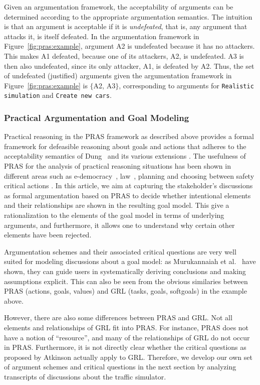 Given an argumentation framework, the acceptability of arguments can be determined according to the appropriate argumentation semantics. The intuition is that an argument is acceptable if it is \emph{undefeated}, that is, any argument that attacks it, is itself defeated. In the argumentation framework in Figure~\ref{fig:pras:example}, argument A2 is undefeated because it has no attackers. This makes A1 defeated, because one of its attackers, A2, is undefeated. A3 is then also undefeated, since its only attacker, A1, is defeated by A2. Thus, the set of undefeated (justified) arguments given the argumentation framework in Figure~\ref{fig:pras:example} is $\{$A2, A3$\}$, corresponding to arguments for \texttt{Realistic simulation} and \texttt{Create new cars}.

\subsubsection*{Practical Argumentation and Goal Modeling}
\label{sect:background:pras:motivation}

Practical reasoning in the PRAS framework as described above provides a formal framework for defeasible reasoning about goals and actions that adheres to the acceptability semantics of Dung~\cite{Dung1995} and its various extensions \cite{amgoud2002reasoning,modgil2009}. The usefulness of PRAS for the analysis of practical reasoning situations has been shown in different areas such as e-democracy~\cite{cartwright2009IS}, law~\cite{atkinson2005legal}, planning \cite{medellin2013planning} and choosing between safety critical actions \cite{tolchinsky2012deliberation}. In this article, we aim at capturing the stakeholder's discussions as formal argumentation based on PRAS to decide whether intentional elements and their relationships are shown in the resulting goal model. This give a rationalization to the elements of the goal model in terms of underlying arguments, and furthermore, it allows one to understand why certain other elements have been rejected.

Argumentation schemes and their associated critical questions are very well suited for modeling discussions about a goal model: as Murukannaiah et al.~\cite{murukannaiah2015} have shown, they can guide users in systematically deriving conclusions and making assumptions explicit. This can also be seen from the obvious similaries between PRAS (actions, goals, values) and GRL (tasks, goals, softgoals) in the example above.

However, there are also some differences between PRAS and GRL. Not all elements and relationships of GRL fit into PRAS. For instance, PRAS does not have a notion of ``resource'', and many of the relationships of GRL do not occur in PRAS. Furthermore, it is not directly clear whether the critical questions as proposed by Atkinson actually apply to GRL. Therefore, we develop our own set of argument schemes and critical questions in the next section by analyzing transcripts of discussions about the traffic simulator.